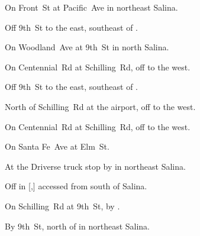 

\begin{LocationList}

On Front~St at Pacific~Ave in northeast Salina.

Off 9th~St to the east, southeast of  .

On Woodland~Ave at 9th~St in north Salina.

On Centennial~Rd at Schilling~Rd, off   to the west.

\Location{\GarageHQ \Garage}
Off 9th~St to the east, southeast of  .

North of Schilling~Rd at the airport, off   to the west.

\Location{\RecruitmentAgency \Recruitment}
On Centennial~Rd at Schilling~Rd, off   to the west.

On Santa Fe~Ave at Elm~St.

At the Driverse truck stop by   in northeast Salina.

Off  in [,] accessed from  south of Salina.

On Schilling~Rd at 9th~St, by  .

By  9th~St, north of   in northeast Salina.

\end{LocationList}
